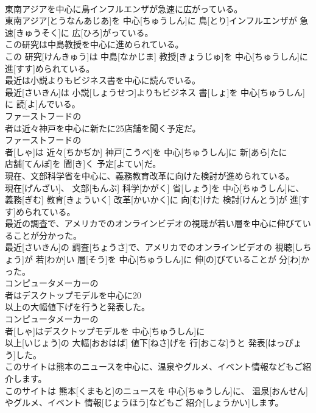 \documentclass[8pt]{extreport}
\begin{document}
\begin{CJK}{UTF8}{min}
\\	東南アジアを中心に鳥インフルエンザが急速に広がっている。	
\\	東南アジア[とうなんあじあ]を 中心[ちゅうしん]に 鳥[とり]インフルエンザが 急速[きゅうそく]に 広[ひろ]がっている。
\\	この研究は中島教授を中心に進められている。	
\\	この 研究[けんきゅう]は 中島[なかじま] 教授[きょうじゅ]を 中心[ちゅうしん]に 進[すす]められている。
\\	最近は小説よりもビジネス書を中心に読んでいる。	
\\	最近[さいきん]は 小説[しょうせつ]よりもビジネス 書[しょ]を 中心[ちゅうしん]に 読[よ]んでいる。
\\	ファーストフードの
\\	者は近々神戸を中心に新たに25店舗を聞く予定だ。	
\\	ファーストフードの 
\\	者[しゃ]は 近々[ちかぢか] 神戸[こうべ]を 中心[ちゅうしん]に 新[あら]たに 
\\	店舗[てんぽ]を 聞[き]く 予定[よてい]だ。
\\	現在、文部科学省を中心に、義務教育改革に向けた検討が進められている。	
\\	現在[げんざい]、 文部[もんぶ] 科学[かがく] 省[しょう]を 中心[ちゅうしん]に、 義務[ぎむ] 教育[きょういく] 改革[かいかく]に 向[む]けた 検討[けんとう]が 進[すす]められている。
\\	最近の調査で、アメリカでのオンラインビデオの視聴が若い層を中心に伸びていることが分かった。	
\\	最近[さいきん]の 調査[ちょうさ]で、アメリカでのオンラインビデオの 視聴[しちょう]が 若[わか]い 層[そう]を 中心[ちゅうしん]に 伸[の]びていることが 分[わ]かった。
\\	コンピュータメーカーの
\\	者はデスクトップモデルを中心に20
\\	以上の大幅値下げを行うと発表した。	
\\	コンピュータメーカーの 
\\	者[しゃ]はデスクトップモデルを 中心[ちゅうしん]に 
\\	以上[いじょう]の 大幅[おおはば] 値下[ねさ]げを 行[おこな]うと 発表[はっぴょう]した。
\\	このサイトは熊本のニュースを中心に、温泉やグルメ、イベント情報などもご紹介します。	
\\	このサイトは 熊本[くまもと]のニュースを 中心[ちゅうしん]に、 温泉[おんせん]やグルメ、イベント 情報[じょうほう]などもご 紹介[しょうかい]します。

\end{CJK}
\end{document}
